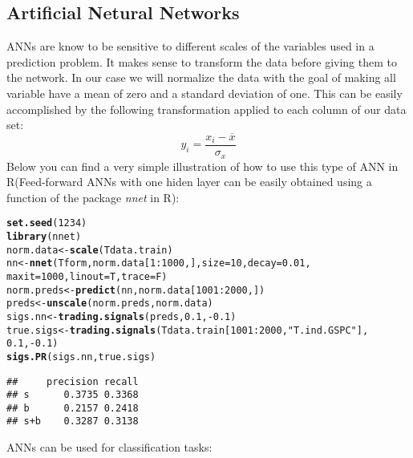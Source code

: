 \documentclass{article}\usepackage[]{graphicx}\usepackage[]{color}
\makeatletter
\newcommand{\hlnum}[1]{\textcolor[rgb]{0.686,0.059,0.569}{#1}}%
\newcommand{\hlstr}[1]{\textcolor[rgb]{0.192,0.494,0.8}{#1}}%
\newcommand{\hlopt}[1]{\textcolor[rgb]{0,0,0}{#1}}%
\newcommand{\hlstd}[1]{\textcolor[rgb]{0.345,0.345,0.345}{#1}}%
\newcommand{\hlkwb}[1]{\textcolor[rgb]{0.69,0.353,0.396}{#1}}%
\newcommand{\hlkwc}[1]{\textcolor[rgb]{0.333,0.667,0.333}{#1}}%
\newcommand{\hlkwd}[1]{\textcolor[rgb]{0.737,0.353,0.396}{\textbf{#1}}}%
\newenvironment{kframe}{%
 \def\at@end@of@kframe{}%
 \ifinner\ifhmode%
  \def\at@end@of@kframe{\end{minipage}}%
  \begin{minipage}{\columnwidth}%
 \fi\fi%
 \def\FrameCommand##1{\hskip\@totalleftmargin \hskip-\fboxsep
 \colorbox{shadecolor}{##1}\hskip-\fboxsep
     \hskip-\linewidth \hskip-\@totalleftmargin \hskip\columnwidth}%
 \MakeFramed {\advance\hsize-\width
   \@totalleftmargin\z@ \linewidth\hsize
   \@setminipage}}%
 {\par\unskip\endMakeFramed%
 \at@end@of@kframe}
\newenvironment{knitrout}{}{} %
\makeatother
\begin{document}
\subsection{Artificial Netural Networks}
ANNs are know to be sensitive to different scales of the variables used in a prediction problem. It makes sense to transform the data before giving them to the network. In our case we will normalize the data with the goal of making all variable have a mean of zero and a standard deviation of one. This can be easily accomplished by the following transformation applied to each column of our data set:
$$y_i = \frac{x_i - \overline{x}}{\sigma_x}$$
Below you can find a very simple illustration of how to use this type of ANN in R(Feed-forward ANNs with one hiden layer can be easily obtained using a function of the package \textit{nnet} in R):
\begin{knitrout}
\color{fgcolor}\begin{kframe}
\begin{alltt}
\hlkwd{set.seed}\hlstd{(}\hlnum{1234}\hlstd{)}
\hlkwd{library}\hlstd{(nnet)}
\hlstd{norm.data} \hlkwb{<-} \hlkwd{scale}\hlstd{(Tdata.train)}
\hlstd{nn} \hlkwb{<-} \hlkwd{nnet}\hlstd{(Tform, norm.data[}\hlnum{1}\hlopt{:}\hlnum{1000}\hlstd{, ],} \hlkwc{size} \hlstd{=} \hlnum{10}\hlstd{,} \hlkwc{decay} \hlstd{=} \hlnum{0.01}\hlstd{,}
           \hlkwc{maxit} \hlstd{=} \hlnum{1000}\hlstd{,} \hlkwc{linout} \hlstd{= T,} \hlkwc{trace} \hlstd{= F)}
\hlstd{norm.preds} \hlkwb{<-} \hlkwd{predict}\hlstd{(nn, norm.data[}\hlnum{1001}\hlopt{:}\hlnum{2000}\hlstd{, ])}
\hlstd{preds} \hlkwb{<-} \hlkwd{unscale}\hlstd{(norm.preds, norm.data)}
\hlstd{sigs.nn} \hlkwb{<-} \hlkwd{trading.signals}\hlstd{(preds,} \hlnum{0.1}\hlstd{,} \hlopt{-}\hlnum{0.1}\hlstd{)}
\hlstd{true.sigs} \hlkwb{<-} \hlkwd{trading.signals}\hlstd{(Tdata.train[}\hlnum{1001}\hlopt{:}\hlnum{2000}\hlstd{,} \hlstr{"T.ind.GSPC"}\hlstd{],}
                             \hlnum{0.1}\hlstd{,} \hlopt{-}\hlnum{0.1}\hlstd{)}
\hlkwd{sigs.PR}\hlstd{(sigs.nn, true.sigs)}
\end{alltt}
\begin{verbatim}
##     precision recall
## s      0.3735 0.3368
## b      0.2157 0.2418
## s+b    0.3287 0.3138
\end{verbatim}
\end{kframe}
\end{knitrout}
ANNs can be used for classification tasks:
\end{document}
